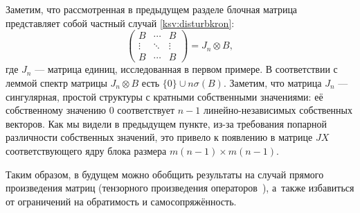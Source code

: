 Заметим, что рассмотренная в предыдущем разделе
    блочная матрица
    представляет собой частный случай \eqref{ksv:disturbkron}:
\[
    \begin{pmatrix}
        B      & \cdots & B \\
        \vdots & \ddots & \vdots \\
        B      & \cdots & B
    \end{pmatrix} =
    J_n \otimes B,
        \]
    где \( J_n \) --- матрица единиц,
    исследованная в первом примере.
В соответствии с леммой спектр
    матрицы \( J_n \otimes B \)
    есть \( \{ 0 \} \cup n\sigma(B) \).
Заметим, что матрица \( J_n \)
    --- сингулярная, простой структуры с кратными собственными значениями:
    её собственному значению \( 0 \)
    соответствует \( n{-}1 \) линейно-независимых
    собственных векторов.
Как мы видели в предыдущем пункте,
    из-за требования попарной различности собственных значений,
    это привело к появлению  в матрице \( J X \) соответствующего ядру
    блока размера \( m(n{-}1)\times m(n{-}1) \).

Таким образом, в будущем можно обобщить результаты
    на случай прямого произведения матриц
    (тензорного произведения операторов~\cite{abraham2012manifolds}),
    а~также избавиться от ограничений на обратимость и самосопряжённость.
